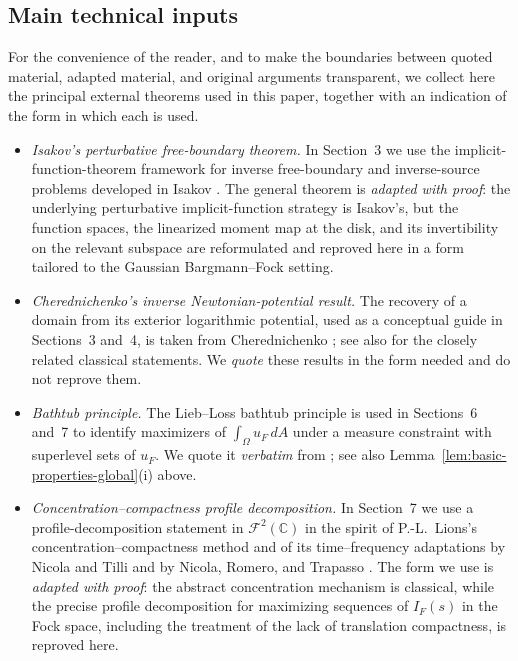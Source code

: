 \documentclass[a4paper,11pt,reqno]{amsart}
\numberwithin{equation}{section}
\theoremstyle{plain} %
\theoremstyle{definition} %
\theoremstyle{remark}
\newcommand{\C}{\mathbb{C}}
\begin{document}
\subsection{Main technical inputs}\label{subsec:main-technical-inputs}

For the convenience of the reader, and to make the boundaries between
quoted material, adapted material, and original arguments transparent, we
collect here the principal external theorems used in this paper, together
with an indication of the form in which each is used.

\begin{itemize}
\item \emph{Isakov's perturbative free-boundary theorem.} In Section~3 we
use the implicit-function-theorem framework for inverse free-boundary and
inverse-source problems developed in Isakov \cite{Isakov}. The general
theorem is \emph{adapted with proof}: the underlying perturbative
implicit-function strategy is Isakov's, but the function spaces, the
linearized moment map at the disk, and its invertibility on the relevant
subspace are reformulated and reproved here in a form tailored to the
Gaussian Bargmann--Fock setting.

\item \emph{Cherednichenko's inverse Newtonian-potential result.} The
recovery of a domain from its exterior logarithmic potential, used as a
conceptual guide in Sections~3 and~4, is taken from Cherednichenko
\cite{Cherednichenko}; see also \cite{Karp,Aharonov-Schiffer-Zalcman} for
the closely related classical statements. We \emph{quote} these
results in the form needed and do not reprove them.

\item \emph{Bathtub principle.} The Lieb--Loss bathtub principle is used
in Sections~6 and~7 to identify maximizers of $\int_\Omega u_F\,dA$ under
a measure constraint with superlevel sets of $u_F$. We quote it
\emph{verbatim} from \cite{Lieb}; see also Lemma~\ref{lem:basic-properties-global}(i)
above.

\item \emph{Concentration--compactness profile decomposition.} In
Section~7 we use a profile-decomposition statement in $\mathcal F^2(\C)$
in the spirit of P.-L.~Lions's concentration--compactness method and of
its time--frequency adaptations by Nicola and Tilli \cite{Nicola-Tilli,Nicola-Tilli-2}
and by Nicola, Romero, and Trapasso \cite{Nicola-Romero-Trapasso}. The
form we use is \emph{adapted with proof}: the abstract concentration
mechanism is classical, while the precise profile decomposition for
maximizing sequences of $I_F(s)$ in the Fock space, including the
treatment of the lack of translation compactness, is reproved here.


\end{itemize}
\end{document}
